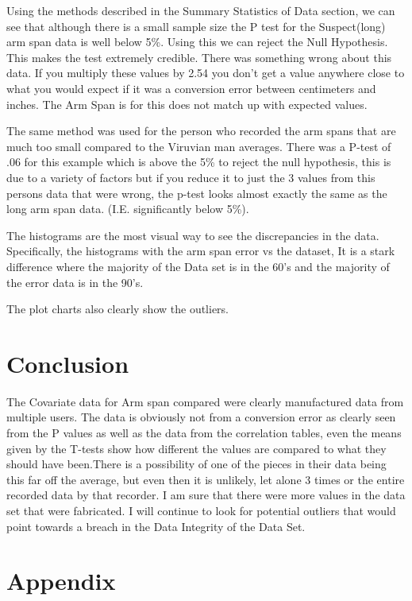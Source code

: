 \documentclass[]{article}
\begin{document}
Using the methods described in the Summary Statistics of Data section,
we can see that although there is a small sample size the P test for the
Suspect(long) arm span data is well below 5\%. Using this we can reject
the Null Hypothesis. This makes the test extremely credible. There was
something wrong about this data. If you multiply these values by 2.54
you don't get a value anywhere close to what you would expect if it was
a conversion error between centimeters and inches. The Arm Span is for
this does not match up with expected values.

The same method was used for the person who recorded the arm spans that
are much too small compared to the Viruvian man averages. There was a
P-test of .06 for this example which is above the 5\% to reject the null
hypothesis, this is due to a variety of factors but if you reduce it to
just the 3 values from this persons data that were wrong, the p-test
looks almost exactly the same as the long arm span data. (I.E.
significantly below 5\%).

The histograms are the most visual way to see the discrepancies in the
data. Specifically, the histograms with the arm span error vs the
dataset, It is a stark difference where the majority of the Data set is
in the 60's and the majority of the error data is in the 90's.

The plot charts also clearly show the outliers.

\label{sec:findings}

\section{Conclusion}

The Covariate data for Arm span compared were clearly manufactured data
from multiple users. The data is obviously not from a conversion error
as clearly seen from the P values as well as the data from the
correlation tables, even the means given by the T-tests show how
different the values are compared to what they should have been.There is
a possibility of one of the pieces in their data being this far off the
average, but even then it is unlikely, let alone 3 times or the entire
recorded data by that recorder. I am sure that there were more values in
the data set that were fabricated. I will continue to look for potential
outliers that would point towards a breach in the Data Integrity of the
Data Set. \label{sec:conclusion}

\section{Appendix}
\end{document}
